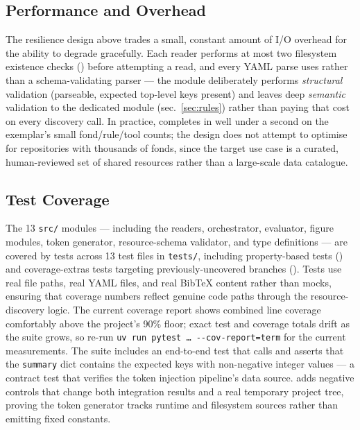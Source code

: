 \documentclass[
]{article}
\begin{document}
\subsection{Performance and Overhead}\label{performance-and-overhead}

The resilience design above trades a small, constant amount of I/O
overhead for the ability to degrade gracefully. Each reader performs at
most two filesystem existence checks ()
before attempting a read, and every YAML parse uses
 rather than a schema-validating parser ---
the module deliberately performs \emph{structural} validation
(parseable, expected top-level keys present) and leaves deep
\emph{semantic} validation to the dedicated
 module (sec.~\ref{sec:rules}) rather
than paying that cost on every discovery call. In practice,
 completes in well under a
second on the exemplar's small fond/rule/tool counts; the design does
not attempt to optimise for repositories with thousands of fonds, since
the target use case is a curated, human-reviewed set of shared resources
rather than a large-scale data catalogue.

\subsection{Test Coverage}\label{test-coverage}

The 13 \texttt{src/} modules --- including the readers, orchestrator,
evaluator, figure modules, token generator, resource-schema validator,
and type definitions --- are covered by tests across 13 test files in
\texttt{tests/}, including property-based tests
() and coverage-extras tests targeting
previously-uncovered branches ().
Tests use real file paths, real YAML files, and real BibTeX content
rather than mocks, ensuring that coverage numbers reflect genuine code
paths through the resource-discovery logic. The current coverage report
shows combined line coverage comfortably above the project's 90\% floor;
exact test and coverage totals drift as the suite grows, so re-run
\texttt{uv\ run\ pytest\ …\ -\/-cov-report=term} for the current
measurements. The  suite
includes an end-to-end test that calls 
and asserts that the \texttt{summary} dict contains the expected keys
with non-negative integer values --- a contract test that verifies the
token injection pipeline's data source.
 adds negative
controls that change both integration results and a real temporary
project tree, proving the token generator tracks runtime and filesystem
sources rather than emitting fixed constants.
\end{document}
